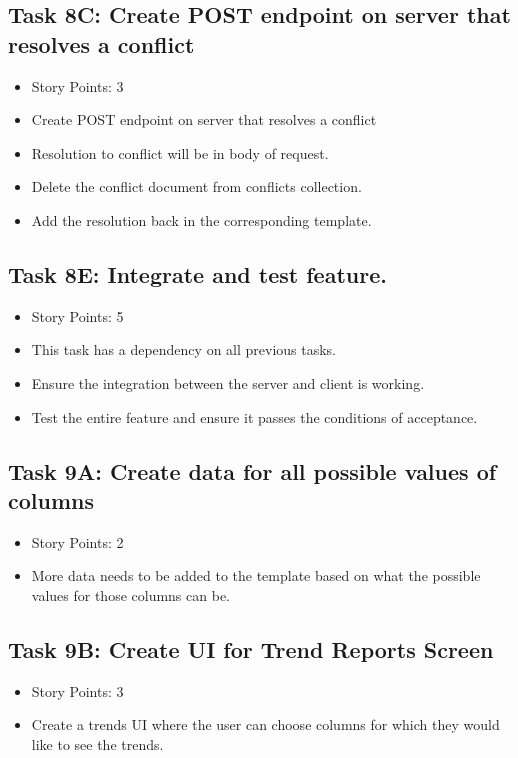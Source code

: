 \documentclass[12pt]{article}
\begin{document}
\subsection{Task 8C: Create POST endpoint on server that resolves a conflict}
\begin{itemize}%
\item Story Points: 3
\item Create POST endpoint on server that resolves a conflict
\item Resolution to conflict will be in body of request. 
\item Delete the conflict document from conflicts collection.
\item Add the resolution back in the corresponding template.
\end{itemize}

\subsection{Task 8E: Integrate and test feature.}
\begin{itemize}%
\item Story Points: 5
\item This task has a dependency on all previous tasks.
\item Ensure the integration between the server and client is working.
\item Test the entire feature and ensure it passes the conditions of acceptance.
\end{itemize}

\subsection{Task 9A: Create data for all possible values of columns}
\begin{itemize}%
\item Story Points: 2
\item More data needs to be added to the template based on what the possible values for those columns can be.
\end{itemize}

\subsection{Task 9B: Create UI for Trend Reports Screen}
\begin{itemize}%
\item Story Points: 3
\item Create a trends UI where the user can choose columns for which they would like to see the trends. 
\end{itemize}
\end{document}
